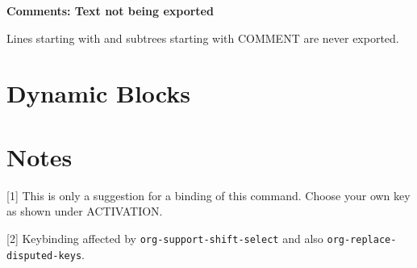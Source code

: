 {\bf Comments: Text not being exported}

Lines starting with \kbd{\#} and subtrees starting with COMMENT are
never exported.


\section{Dynamic Blocks}


\section{Notes}
[1] This is only a suggestion for a binding of this command.  Choose
your own key as shown under ACTIVATION.

[2] Keybinding affected by {\tt org-support-shift-select} and also
 {\tt org-replace-disputed-keys}.

\copyrightnotice

\bye


